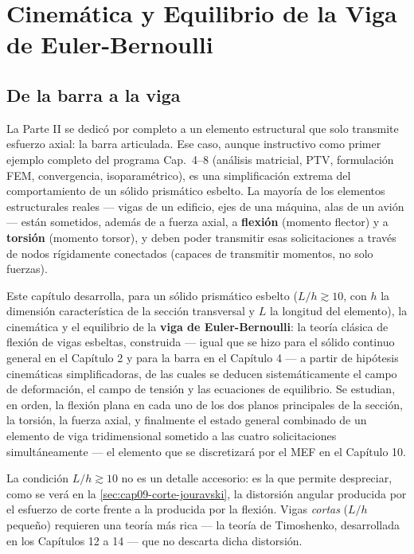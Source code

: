 \chapter{Cinemática y Equilibrio de la Viga de Euler-Bernoulli}
\label{chap:cap09-cinematica-equilibrio-vigas-eb}

\section{De la barra a la viga}
\label{sec:cap09-introduccion}

La Parte II se dedicó por completo a un elemento estructural que solo transmite esfuerzo axial: la barra articulada. Ese caso, aunque instructivo como primer ejemplo completo del programa Cap.~4--8 (análisis matricial, PTV, formulación FEM, convergencia, isoparamétrico), es una simplificación extrema del comportamiento de un sólido prismático esbelto. La mayoría de los elementos estructurales reales --- vigas de un edificio, ejes de una máquina, alas de un avión --- están sometidos, además de a fuerza axial, a \textbf{flexión} (momento flector) y a \textbf{torsión} (momento torsor), y deben poder transmitir esas solicitaciones a través de nodos rígidamente conectados (capaces de transmitir momentos, no solo fuerzas).

Este capítulo desarrolla, para un sólido prismático esbelto ($L/h\gtrsim 10$, con $h$ la dimensión característica de la sección transversal y $L$ la longitud del elemento), la cinemática y el equilibrio de la \textbf{viga de Euler-Bernoulli}: la teoría clásica de flexión de vigas esbeltas, construida --- igual que se hizo para el sólido continuo general en el Capítulo 2 y para la barra en el Capítulo 4 --- a partir de hipótesis cinemáticas simplificadoras, de las cuales se deducen sistemáticamente el campo de deformación, el campo de tensión y las ecuaciones de equilibrio. Se estudian, en orden, la flexión plana en cada uno de los dos planos principales de la sección, la torsión, la fuerza axial, y finalmente el estado general combinado de un elemento de viga tridimensional sometido a las cuatro solicitaciones simultáneamente --- el elemento que se discretizará por el MEF en el Capítulo 10.

\begin{observacion}
La condición $L/h\gtrsim 10$ no es un detalle accesorio: es la que permite despreciar, como se verá en la \cref{sec:cap09-corte-jouravski}, la distorsión angular producida por el esfuerzo de corte frente a la producida por la flexión. Vigas \emph{cortas} ($L/h$ pequeño) requieren una teoría más rica --- la teoría de Timoshenko, desarrollada en los Capítulos 12 a 14 --- que no descarta dicha distorsión.
\end{observacion}

